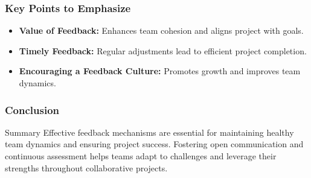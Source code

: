 \documentclass[aspectratio=169]{beamer}
\begin{document}
\begin{frame}[fragile]
    \frametitle{Key Points to Emphasize}
    \begin{itemize}
        \item \textbf{Value of Feedback:} Enhances team cohesion and aligns project with goals.
        \item \textbf{Timely Feedback:} Regular adjustments lead to efficient project completion.
        \item \textbf{Encouraging a Feedback Culture:} Promotes growth and improves team dynamics.
    \end{itemize}
\end{frame}

\begin{frame}[fragile]
    \frametitle{Conclusion}
    \begin{block}{Summary}
        Effective feedback mechanisms are essential for maintaining healthy team dynamics and ensuring project success. Fostering open communication and continuous assessment helps teams adapt to challenges and leverage their strengths throughout collaborative projects.
    \end{block}
\end{frame}
\end{document}
